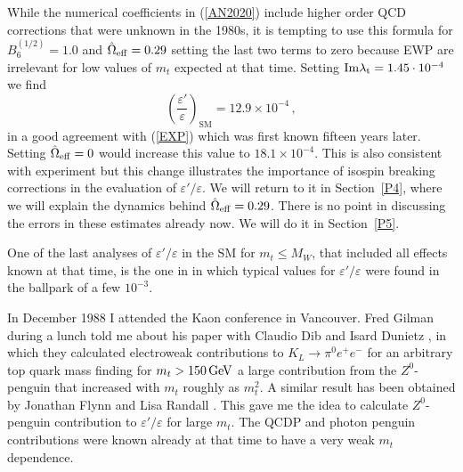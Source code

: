 \documentclass[12pt,a4paper]{article}
\newcommand{\IM}{{\rm Im}}
\newcommand{\gev}{\, {\rm GeV}}
\newcommand{\bsi}{B_6^{(1/2)}}
\def\epe{\varepsilon'/\varepsilon}
\newcommand{\be}{\begin{equation}}
\newcommand{\ee}{\end{equation}}
\begin{document}
While the numerical coefficients  in (\ref{AN2020}) include higher order
QCD corrections that were unknown in the 1980s, it is tempting
to use this formula for $\bsi=1.0$ and $\hat\Omega_{\rm eff}=0.29$ setting
the last two terms to zero because EWP are irrelevant for low values of
$m_t$ expected at that time. Setting ${\IM\lambda_{\rm t}}=1.45\cdot 10^{-4}$
we find
\be
\left(\frac{\varepsilon'}{\varepsilon}\right)_{\text{SM}}= 12.9\times 10^{-4}\,,
\ee
in a good agreement with (\ref{EXP}) which was first known fifteen years
later. Setting $\hat\Omega_{\rm eff}=0$ would increase this value to $18.1\times 10^{-4}$.
This is also consistent with experiment but this change illustrates
the importance of isospin breaking corrections in the evaluation of $\epe$.
We will return to it in Section~\ref{P4}, where we will explain the dynamics
behind $\hat\Omega_{\rm eff}=0.29$. There is no point in discussing the
errors in these estimates already now. We will do it in Section~\ref{P5}.


One of the last analyses of $\epe$ in the SM for $m_t\le M_W$, that
included all effects known at that time, is the one in \cite{Buras:1987qa}
in which typical values for $\epe$ were found in the ballpark of a few $10^{-3}$.

In December 1988 I attended the Kaon conference in Vancouver. Fred Gilman during
a lunch told me about his paper with Claudio Dib and Isard Dunietz \cite{Dib:1988md}, in  which they calculated electroweak contributions to $K_L\to\pi^0e^+ e^-$ for an arbitrary top quark mass finding for $m_t> 150\gev$
a large contribution from the $Z^0$-penguin that increased with $m_t$ roughly
 as $m_t^2$. A similar result has been obtained by Jonathan Flynn and Lisa Randall \cite{Flynn:1988ve}.  This gave me the idea to calculate  $Z^0$-penguin contribution  to $\epe$ for large $m_t$. The QCDP and photon penguin
contributions were known already at that time to have a very weak $m_t$ dependence.
\end{document}
